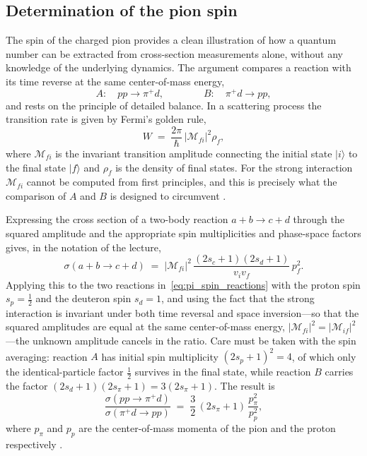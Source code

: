 \FloatBarrier

\subsection{Determination of the pion spin}
\label{subsec:pion-spin}

The spin of the charged pion provides a clean illustration of how a quantum number
can be extracted from cross-section measurements alone, without any knowledge of
the underlying dynamics. The argument compares a reaction with its time reverse at
the same center-of-mass energy,
\begin{equation}
    A: \quad pp \to \pi^+ d ,
    \qquad\qquad
    B: \quad \pi^+ d \to pp ,
    \label{eq:pi_spin_reactions}
\end{equation}
and rests on the principle of detailed balance. In a scattering process the
transition rate is given by Fermi's golden rule,
\begin{equation}
    W \;=\; \frac{2\pi}{\hbar}\,\lvert \mathcal{M}_{fi} \rvert^2 \rho_f ,
    \label{eq:golden_rule}
\end{equation}
where $\mathcal{M}_{fi}$ is the invariant transition amplitude connecting the
initial state $\lvert i \rangle$ to the final state $\lvert f \rangle$ and
$\rho_f$ is the density of final states. For the strong interaction
$\mathcal{M}_{fi}$ cannot be computed from first principles, and this is precisely
what the comparison of $A$ and $B$ is designed to circumvent
\cite[Ch.~2]{Amsler2018}.

Expressing the cross section of a two-body reaction
$a + b \to c + d$ through the squared amplitude and the appropriate spin
multiplicities and phase-space factors gives, in the notation of the lecture,
\begin{equation}
    \sigma(a + b \to c + d)
    \;=\;
    \lvert \mathcal{M}_{fi} \rvert^2
    \,\frac{(2 s_c + 1)(2 s_d + 1)}{v_i v_f}\, p_f^2 .
    \label{eq:sigma_general}
\end{equation}
Applying this to the two reactions in~\eqref{eq:pi_spin_reactions} with the proton
spin $s_p = \tfrac{1}{2}$ and the deuteron spin $s_d = 1$, and using the fact that
the strong interaction is invariant under both time reversal and space inversion---so
that the squared amplitudes are equal at the same center-of-mass energy,
$\lvert \mathcal{M}_{fi} \rvert^2 = \lvert \mathcal{M}_{if} \rvert^2$---the unknown
amplitude cancels in the ratio. Care must be taken with the spin averaging:
reaction $A$ has initial spin multiplicity $(2 s_p + 1)^2 = 4$, of which only the
identical-particle factor $\tfrac{1}{2}$ survives in the final state, while reaction
$B$ carries the factor $(2 s_d + 1)(2 s_\pi + 1) = 3(2 s_\pi + 1)$. The result is
\begin{equation}
    \frac{\sigma(pp \to \pi^+ d)}{\sigma(\pi^+ d \to pp)}
    \;=\;
    \frac{3}{2}\,(2 s_\pi + 1)\,\frac{p_\pi^2}{p_p^2} ,
    \label{eq:pi_spin_ratio}
\end{equation}
where $p_\pi$ and $p_p$ are the center-of-mass momenta of the pion and the proton
respectively \cite[Ch.~2]{Amsler2018}.

